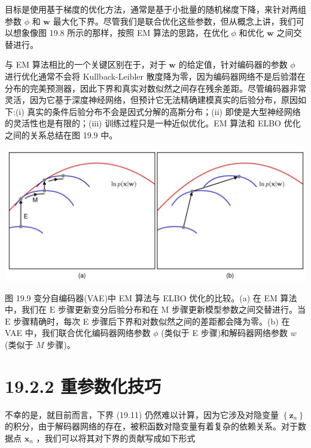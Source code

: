 \documentclass[10pt]{report}
\begin{document}
目标是使用基于梯度的优化方法，通常是基于小批量的随机梯度下降，来针对两组参数 \(\phi\) 和 \(\mathbf{w}\) 最大化下界。尽管我们是联合优化这些参数，但从概念上讲，我们可以想象像图 19.8 所示的那样，按照 EM 算法的思路，在优化 \(\phi\) 和优化 \(\mathbf{w}\) 之间交替进行。

与 EM 算法相比的一个关键区别在于，对于 \(\mathbf{w}\) 的给定值，针对编码器的参数 \(\phi\) 进行优化通常不会将 Kullback-Leibler 散度降为零，因为编码器网络不是后验潜在分布的完美预测器，因此下界和真实对数似然之间存在残余差距。尽管编码器非常灵活，因为它基于深度神经网络，但预计它无法精确建模真实的后验分布，原因如下:(i) 真实的条件后验分布不会是因式分解的高斯分布；(ii) 即使是大型神经网络的灵活性也是有限的；(iii) 训练过程只是一种近似优化。EM 算法和 ELBO 优化之间的关系总结在图 19.9 中。

\begin{center}
\includegraphics[max width=1.0\textwidth]{images/0194e279-9b28-703a-88f4-c3ac21e2010d_593_237_347_1331_581_0.jpg}
\end{center}
\hspace*{3em} 

图 19.9 变分自编码器(VAE)中 EM 算法与 ELBO 优化的比较。(a) 在 EM 算法中，我们在 \(\mathrm{E}\) 步骤更新变分后验分布和在 \(\mathrm{M}\) 步骤更新模型参数之间交替进行。当 \(\mathrm{E}\) 步骤精确时，每次 E 步骤后下界和对数似然之间的差距都会降为零。(b) 在 VAE 中，我们联合优化编码器网络参数 \(\phi\) (类似于 E 步骤)和解码器网络参数 \(w\) (类似于 \(M\) 步骤)。

\section*{19.2.2 重参数化技巧}

不幸的是，就目前而言，下界 (19.11) 仍然难以计算，因为它涉及对隐变量 \(\left\{  {\mathbf{z}}_{n}\right\}\) 的积分，由于解码器网络的存在，被积函数对隐变量有着复杂的依赖关系。对于数据点 \({\mathbf{x}}_{n}\) ，我们可以将其对下界的贡献写成如下形式
\end{document}
